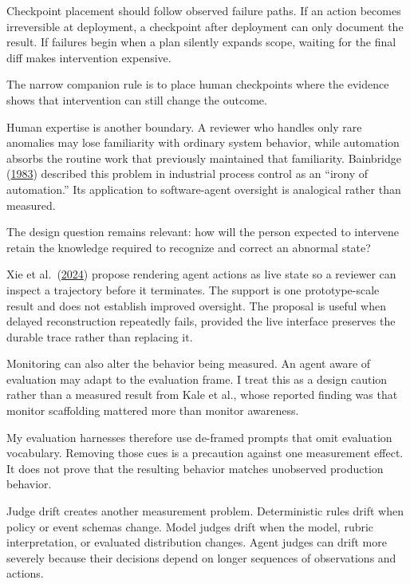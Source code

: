 Checkpoint placement should follow observed failure paths. If an action becomes irreversible at deployment, a checkpoint after deployment can only document the result. If failures begin when a plan silently expands scope, waiting for the final diff makes intervention expensive.

The narrow companion rule is to place human checkpoints where the evidence shows that intervention can still change the outcome.

Human expertise is another boundary. A reviewer who handles only rare anomalies may lose familiarity with ordinary system behavior, while automation absorbs the routine work that previously maintained that familiarity. Bainbridge (\href{https://doi.org/10.1016/0005-1098(83)90046-8}{1983}) described this problem in industrial process control as an ``irony of automation.'' Its application to software-agent oversight is analogical rather than measured.

The design question remains relevant: how will the person expected to intervene retain the knowledge required to recognize and correct an abnormal state?

Xie et al.~(\href{https://arxiv.org/abs/2408.01703}{2024}) propose rendering agent actions as live state so a reviewer can inspect a trajectory before it terminates. The support is one prototype-scale result and does not establish improved oversight. The proposal is useful when delayed reconstruction repeatedly fails, provided the live interface preserves the durable trace rather than replacing it.

Monitoring can also alter the behavior being measured. An agent aware of evaluation may adapt to the evaluation frame. I treat this as a design caution rather than a measured result from Kale et al., whose reported finding was that monitor scaffolding mattered more than monitor awareness.

My evaluation harnesses therefore use de-framed prompts that omit evaluation vocabulary. Removing those cues is a precaution against one measurement effect. It does not prove that the resulting behavior matches unobserved production behavior.

Judge drift creates another measurement problem. Deterministic rules drift when policy or event schemas change. Model judges drift when the model, rubric interpretation, or evaluated distribution changes. Agent judges can drift more severely because their decisions depend on longer sequences of observations and actions.


